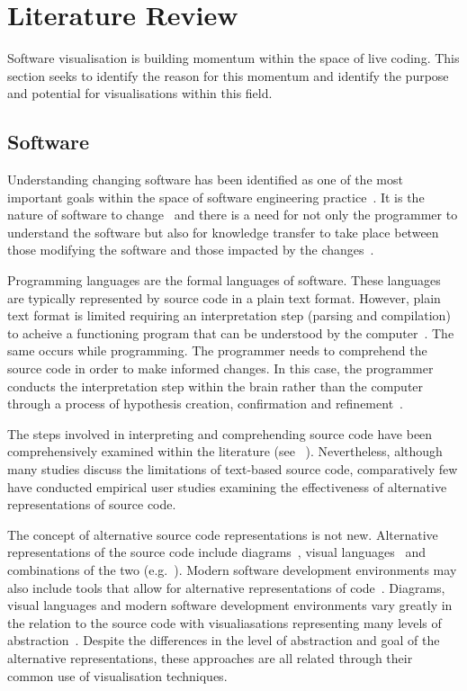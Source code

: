 
\chapter{Literature Review}
\label{chap:literature-review}

Software visualisation is building momentum within the space of live coding. This section seeks to identify the reason for this momentum and identify the purpose and potential for visualisations within this field.

\section{Software}

Understanding changing software has been identified as one of the most important goals within the space of software engineering practice~\cite{Tao2012}. It is the nature of software to change~\cite{Brooks1995} and there is a need for not only the programmer to understand the software but also for knowledge transfer to take place between those modifying the software and those impacted by the changes~\cite{Tao2012}.

Programming languages are the formal languages of software. These languages are typically represented by source code in a plain text format. However, plain text format is limited requiring an interpretation step (parsing and compilation) to acheive a functioning program that can be understood by the computer~\cite{Badros2000}. The same occurs while programming. The programmer needs to comprehend the source code in order to make informed changes. In this case, the programmer conducts the interpretation step within the brain rather than the computer through a process of hypothesis creation, confirmation and refinement~\cite{Brooks1983}.

The steps involved in interpreting and comprehending source code have been comprehensively examined within the literature (see ~\cite{Novais2013,McLean2010a,Brooks1995,Desmond,Rajlich2002}). Nevertheless, although many studies discuss the limitations of text-based source code, comparatively few have conducted empirical user studies examining the effectiveness of alternative representations of source code.

The concept of alternative source code representations is not new. Alternative representations of the source code include diagrams~\cite{Rumbaugh2004}, visual languages~\cite{Cox2007} and combinations of the two (e.g.~\cite{Lucanin2011}). Modern software development environments may also include tools that allow for alternative representations of code~\cite{Cox2007}. Diagrams, visual languages and modern software development environments vary greatly in the relation to the source code with visualiasations representing many levels of abstraction~\cite{Jerding1997}. Despite the differences in the level of abstraction and goal of the alternative representations, these approaches are all related through their common use of visualisation techniques.

